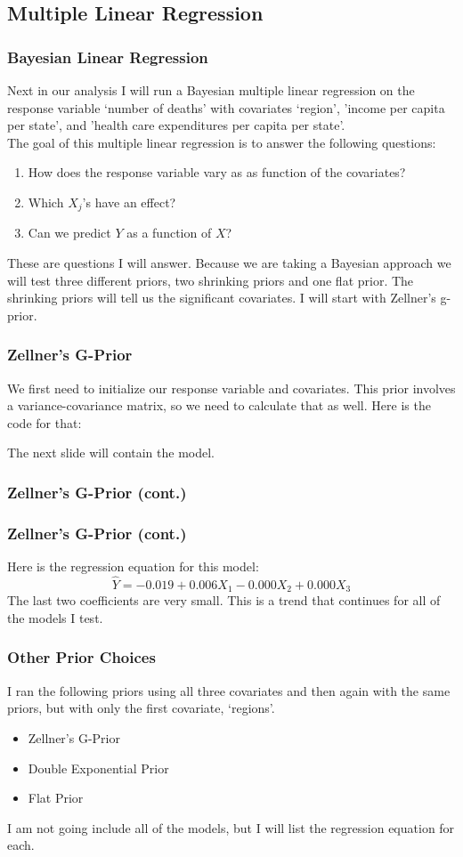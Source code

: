 \documentclass[10pt]{beamer}
\begin{document}
\subsection{Multiple Linear Regression}
\begin{frame}
\frametitle{Bayesian Linear Regression}
	Next in our analysis I will run a Bayesian multiple linear regression on the response variable `number of deaths' with covariates `region', 'income per capita per state', and 'health care expenditures per capita per state'.\\[2mm]
	The goal of this multiple linear regression is to answer the following questions:
		\begin{enumerate}
			\item How does the response variable vary as as function of the covariates?
			\item Which $X_j$'s have an effect?
			\item Can we predict $Y$ as a function of $X$?
		\end{enumerate}
	These are questions I will answer. Because we are taking a Bayesian approach we will test three different priors, two shrinking priors and one flat prior. The shrinking priors will tell us the significant covariates. I will start with Zellner's g-prior.
\end{frame}

\begin{frame}
\frametitle{Zellner's G-Prior}
	We first need to initialize our response variable and covariates. This prior involves a variance-covariance matrix, so we need to calculate that as well. Here is the code for that:
		
	The next slide will contain the model.
\end{frame}

\begin{frame}
\frametitle{Zellner's G-Prior (cont.)}
	
\end{frame}

\begin{frame}
\frametitle{Zellner's G-Prior (cont.)}
	
	Here is the regression equation for this model: $$\hat{Y}=-0.019+0.006X_1-0.000X_2+0.000X_3$$ The last two coefficients are very small. This is a trend that continues for all of the models I test.
\end{frame}

\begin{frame}
\frametitle{Other Prior Choices}
	I ran the following priors using all three covariates and then again with the same priors, but with only the first covariate, `regions'.
		\begin{itemize}
			\item Zellner's G-Prior
			\item Double Exponential Prior
			\item Flat Prior
		\end{itemize}
	I am not going include all of the models, but I will list the regression equation for each.
\end{frame}
\end{document}
